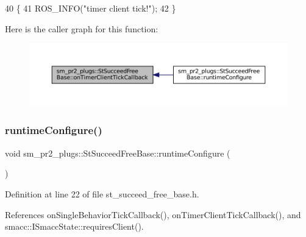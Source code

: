 \begin{DoxyCode}
40     \{
41         ROS\_INFO(\textcolor{stringliteral}{"timer client tick!"});
42     \}
\end{DoxyCode}
Here is the caller graph for this function\+:
\nopagebreak
\begin{figure}[H]
\begin{center}
\leavevmode
\includegraphics[width=350pt]{structsm__pr2__plugs_1_1StSucceedFreeBase_a53328e9b7c378014ba1d19b835808582_icgraph}
\end{center}
\end{figure}
\mbox{\label{structsm__pr2__plugs_1_1StSucceedFreeBase_a90ef93147b370cf240d7800f1414648d}} 
\subsubsection{\texorpdfstring{runtime\+Configure()}{runtimeConfigure()}}
{\footnotesize\ttfamily void sm\+\_\+pr2\+\_\+plugs\+::\+St\+Succeed\+Free\+Base\+::runtime\+Configure (\begin{DoxyParamCaption}{ }\end{DoxyParamCaption})\hspace{0.3cm}{\ttfamily [inline]}}



Definition at line 22 of file st\+\_\+succeed\+\_\+free\+\_\+base.\+h.



References on\+Single\+Behavior\+Tick\+Callback(), on\+Timer\+Client\+Tick\+Callback(), and smacc\+::\+I\+Smacc\+State\+::requires\+Client().


